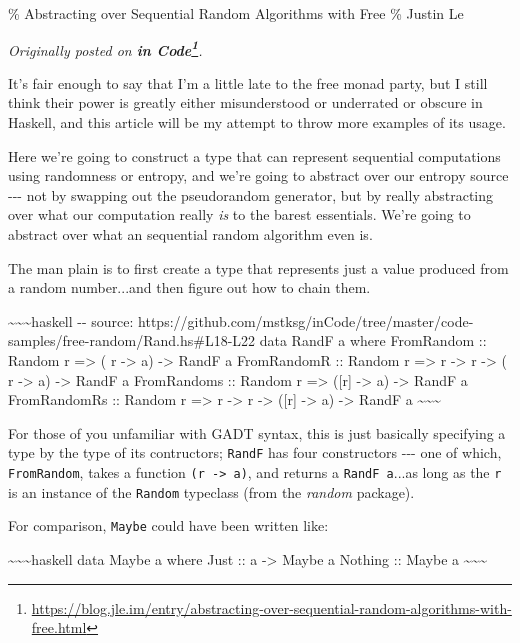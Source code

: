 \documentclass[]{article}
\renewcommand{\href}[2]{#2\footnote{\url{#1}}}
\begin{document}
\% Abstracting over Sequential Random Algorithms with Free \% Justin Le

\emph{Originally posted on
\textbf{\href{https://blog.jle.im/entry/abstracting-over-sequential-random-algorithms-with-free.html}{in
Code}}.}

It's fair enough to say that I'm a little late to the free monad party, but I
still think their power is greatly either misunderstood or underrated or obscure
in Haskell, and this article will be my attempt to throw more examples of its
usage.

Here we're going to construct a type that can represent sequential computations
using randomness or entropy, and we're going to abstract over our entropy source
-\/-\/- not by swapping out the pseudorandom generator, but by really
abstracting over what our computation really \emph{is} to the barest essentials.
We're going to abstract over what an sequential random algorithm even is.

The man plain is to first create a type that represents just a value produced
from a random number...and then figure out how to chain them.

\textasciitilde{}\textasciitilde{}\textasciitilde{}haskell -\/- source:
https://github.com/mstksg/inCode/tree/master/code-samples/free-random/Rand.hs\#L18-L22
data RandF a where FromRandom :: Random r =\textgreater{} ( r -\textgreater{} a)
-\textgreater{} RandF a FromRandomR :: Random r =\textgreater{} r
-\textgreater{} r -\textgreater{} ( r -\textgreater{} a) -\textgreater{} RandF a
FromRandoms :: Random r =\textgreater{} ({[}r{]} -\textgreater{} a)
-\textgreater{} RandF a FromRandomRs :: Random r =\textgreater{} r
-\textgreater{} r -\textgreater{} ({[}r{]} -\textgreater{} a) -\textgreater{}
RandF a \textasciitilde{}\textasciitilde{}\textasciitilde{}

For those of you unfamiliar with GADT syntax, this is just basically specifying
a type by the type of its contructors; \texttt{RandF} has four constructors
-\/-\/- one of which, \texttt{FromRandom}, takes a function
\texttt{(r\ -\textgreater{}\ a)}, and returns a \texttt{RandF\ a}...as long as
the \texttt{r} is an instance of the \texttt{Random} typeclass (from the
\emph{random} package).

For comparison, \texttt{Maybe} could have been written like:

\textasciitilde{}\textasciitilde{}\textasciitilde{}haskell data Maybe a where
Just :: a -\textgreater{} Maybe a Nothing :: Maybe a
\textasciitilde{}\textasciitilde{}\textasciitilde{}
\end{document}
